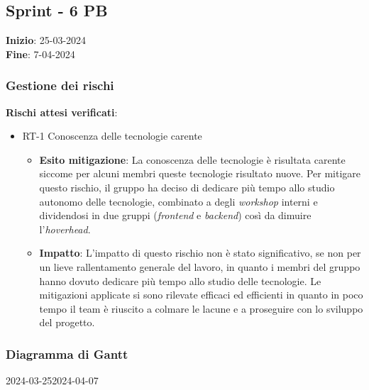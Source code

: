 \subsection{Sprint - 6 PB}
\textbf{Inizio}: 25-03-2024 \\
\textbf{Fine}: 7-04-2024

\subsubsection{Gestione dei rischi}
\textbf{Rischi attesi verificati}:

\begin{itemize}
	\item RT-1 Conoscenza delle tecnologie carente
	      \begin{itemize}
		      \item \textbf{Esito mitigazione}: La conoscenza delle tecnologie
		            è risultata carente siccome per alcuni membri queste tecnologie risultato nuove. 
					Per mitigare questo rischio, il gruppo ha deciso di dedicare più tempo allo studio autonomo delle tecnologie, combinato a degli 
					\textit{workshop} interni e dividendosi in due gruppi (\textit{frontend} e \textit{backend}) così da dimuire l'\textit{hoverhead}.

		      \item \textbf{Impatto}: L'impatto di questo rischio non è stato significativo, se non per un lieve rallentamento generale del lavoro, 
			  in quanto i membri del gruppo hanno dovuto dedicare più tempo allo studio delle tecnologie. Le mitigazioni applicate si sono rilevate efficaci ed efficienti in 
			  quanto in poco tempo il team è riuscito a colmare le lacune e a proseguire con lo sviluppo del progetto.
	      \end{itemize}
\end{itemize}

\subsubsection{Diagramma di Gantt}

\begin{ganttchart}[
		x unit=0.6cm, %
		y unit chart=0.6cm,
		bar/.style={fill=blue!50},
		bar height=0.5,
		time slot format=isodate,
		time slot unit=day,
		vgrid,
		today=2024-03-26,
		today rule/.style={draw=red, ultra thick}
	]{2024-03-25}{2024-04-07}
	 \\
	 \\
	 \\
	 \\
	 \\
\end{ganttchart}

